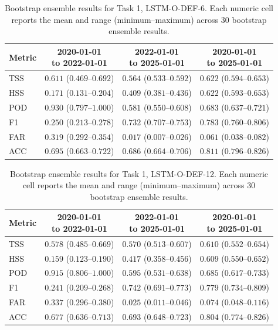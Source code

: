 \begin{table}[htbp]
\centering
\small
\caption{Bootstrap ensemble results for Task 1, LSTM-O-DEF-6. Each numeric cell reports the mean and range (minimum--maximum) across 30 bootstrap ensemble results.}
\label{tab:app-task1-lstm-o-def-6}
\begin{tabular}{lccc}
\toprule
Metric & \shortstack{2020-01-01\\to 2022-01-01} & \shortstack{2022-01-01\\to 2025-01-01} & \shortstack{2020-01-01\\to 2025-01-01} \\
\midrule
TSS & $0.611$ ($0.469$--$0.692$) & $0.564$ ($0.533$--$0.592$) & $0.622$ ($0.594$--$0.653$) \\
HSS & $0.171$ ($0.131$--$0.204$) & $0.409$ ($0.381$--$0.436$) & $0.622$ ($0.593$--$0.653$) \\
POD & $0.930$ ($0.797$--$1.000$) & $0.581$ ($0.550$--$0.608$) & $0.683$ ($0.637$--$0.721$) \\
F1 & $0.250$ ($0.213$--$0.278$) & $0.732$ ($0.707$--$0.753$) & $0.783$ ($0.760$--$0.806$) \\
FAR & $0.319$ ($0.292$--$0.354$) & $0.017$ ($0.007$--$0.026$) & $0.061$ ($0.038$--$0.082$) \\
ACC & $0.695$ ($0.663$--$0.722$) & $0.686$ ($0.664$--$0.706$) & $0.811$ ($0.796$--$0.826$) \\
\bottomrule
\end{tabular}
\end{table}
\clearpage

\begin{table}[htbp]
\centering
\small
\caption{Bootstrap ensemble results for Task 1, LSTM-O-DEF-12. Each numeric cell reports the mean and range (minimum--maximum) across 30 bootstrap ensemble results.}
\label{tab:app-task1-lstm-o-def-12}
\begin{tabular}{lccc}
\toprule
Metric & \shortstack{2020-01-01\\to 2022-01-01} & \shortstack{2022-01-01\\to 2025-01-01} & \shortstack{2020-01-01\\to 2025-01-01} \\
\midrule
TSS & $0.578$ ($0.485$--$0.669$) & $0.570$ ($0.513$--$0.607$) & $0.610$ ($0.552$--$0.654$) \\
HSS & $0.159$ ($0.123$--$0.190$) & $0.417$ ($0.358$--$0.456$) & $0.609$ ($0.550$--$0.652$) \\
POD & $0.915$ ($0.806$--$1.000$) & $0.595$ ($0.531$--$0.638$) & $0.685$ ($0.617$--$0.733$) \\
F1 & $0.241$ ($0.209$--$0.268$) & $0.742$ ($0.691$--$0.773$) & $0.779$ ($0.734$--$0.809$) \\
FAR & $0.337$ ($0.296$--$0.380$) & $0.025$ ($0.011$--$0.046$) & $0.074$ ($0.048$--$0.116$) \\
ACC & $0.677$ ($0.636$--$0.713$) & $0.693$ ($0.648$--$0.723$) & $0.804$ ($0.774$--$0.826$) \\
\bottomrule
\end{tabular}
\end{table}
\clearpage


